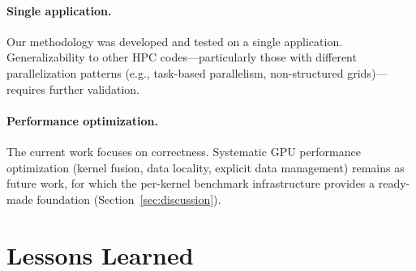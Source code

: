 \documentclass[conference]{IEEEtran}
\begin{document}
\paragraph{Single application.}
Our methodology was developed and tested on a single application.
Generalizability to other HPC codes---particularly those with different
parallelization patterns (e.g., task-based parallelism, non-structured
grids)---requires further validation.

\paragraph{Performance optimization.}
The current work focuses on correctness. Systematic GPU performance
optimization (kernel fusion, data locality, explicit data management)
remains as future work, for which the per-kernel benchmark infrastructure
provides a ready-made foundation (Section~\ref{sec:discussion}).

\section{Lessons Learned}
\label{sec:lessons}
\end{document}
